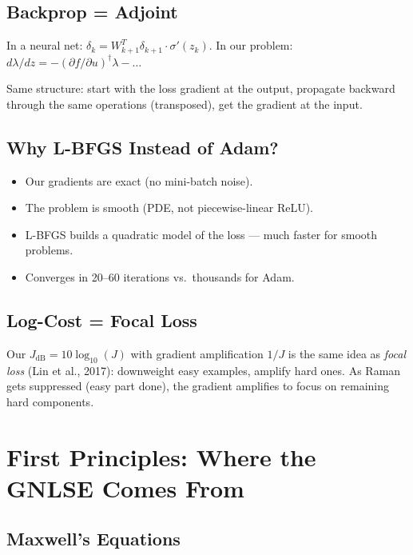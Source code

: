 \documentclass[12pt,a4paper]{article}
\begin{document}
\subsection{Backprop = Adjoint}

In a neural net: $\delta_k = W_{k+1}^T\delta_{k+1}\cdot\sigma'(z_k)$. In our problem: $d\lambda/dz = -(\partial f/\partial u)^\dagger\lambda - \ldots$

Same structure: start with the loss gradient at the output, propagate backward through the same operations (transposed), get the gradient at the input.

\subsection{Why L-BFGS Instead of Adam?}

\begin{itemize}
    \item Our gradients are exact (no mini-batch noise).
    \item The problem is smooth (PDE, not piecewise-linear ReLU).
    \item L-BFGS builds a quadratic model of the loss --- much faster for smooth problems.
    \item Converges in 20--60 iterations vs.\ thousands for Adam.
\end{itemize}

\subsection{Log-Cost = Focal Loss}

Our $J_{\text{dB}} = 10\log_{10}(J)$ with gradient amplification $1/J$ is the same idea as \emph{focal loss} (Lin et al., 2017): downweight easy examples, amplify hard ones. As Raman gets suppressed (easy part done), the gradient amplifies to focus on remaining hard components.


\section{First Principles: Where the GNLSE Comes From}
\label{sec:first_principles}

\subsection{Maxwell's Equations}
\end{document}
